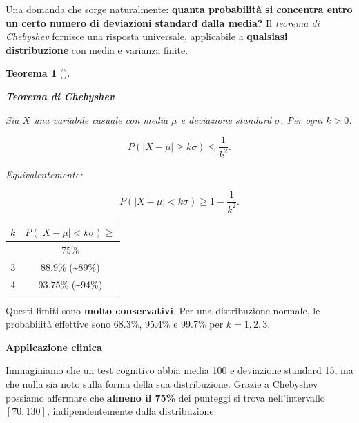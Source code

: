 \documentclass[
  italian,
  letterpaper,
  a4paper,
  11pt,
  open=any]{scrbook}
\newcounter{none} %
\theoremstyle{plain}
\newtheorem{theorem}{Teorema}[chapter]
\theoremstyle{definition}
\theoremstyle{definition}
\theoremstyle{remark}
\begin{document}
\begin{tcolorbox}[enhanced jigsaw, arc=.35mm, bottomrule=.15mm, bottomtitle=1mm, breakable, colback=white, colbacktitle=quarto-callout-note-color!10!white, colframe=quarto-callout-note-color-frame, coltitle=black, left=2mm, leftrule=.75mm, opacityback=0, opacitybacktitle=0.6, rightrule=.15mm, title=\textcolor{quarto-callout-note-color}{\faInfo}\hspace{0.5em}{Approfondimento: il teorema di Chebyshev}, titlerule=0mm, toprule=.15mm, toptitle=1mm]

Una domanda che sorge naturalmente: \textbf{quanta probabilità si
concentra entro un certo numero di deviazioni standard dalla media?} Il
\emph{teorema di Chebyshev} fornisce una risposta universale,
applicabile a \textbf{qualsiasi distribuzione} con media e varianza
finite.

\begin{theorem}[]\protect\hypertarget{thm-chebyshev}{}\label{thm-chebyshev}

\textbf{Teorema di Chebyshev}

Sia \(X\) una variabile casuale con media \(\mu\) e deviazione standard
\(\sigma\). Per ogni \(k > 0\):

\[
P(|X - \mu| \geq k\sigma) \leq \frac{1}{k^2}.
\]

Equivalentemente:

\[
P(|X - \mu| < k\sigma) \geq 1 - \frac{1}{k^2}.
\]

\end{theorem}

{\def\LTcaptype{none} %
\begin{longtable}[]{@{}cc@{}}
\toprule\noalign{}
\(k\) & \(P(|X - \mu| < k\sigma) \geq\) \\
\midrule\noalign{}
\endhead
\bottomrule\noalign{}
\endlastfoot
2 & 75\% \\
3 & 88.9\% (\textasciitilde89\%) \\
4 & 93.75\% (\textasciitilde94\%) \\
\end{longtable}
}

Questi limiti sono \textbf{molto conservativi}. Per una distribuzione
normale, le probabilità effettive sono 68.3\%, 95.4\% e 99.7\% per
\(k = 1, 2, 3\).

\textbf{Applicazione clinica}

Immaginiamo che un test cognitivo abbia media 100 e deviazione standard
15, ma che nulla sia noto sulla forma della sua distribuzione. Grazie a
Chebyshev possiamo affermare che \textbf{almeno il 75\%} dei punteggi si
trova nell'intervallo \([70, 130]\), indipendentemente dalla
distribuzione.

\end{tcolorbox}
\end{document}
